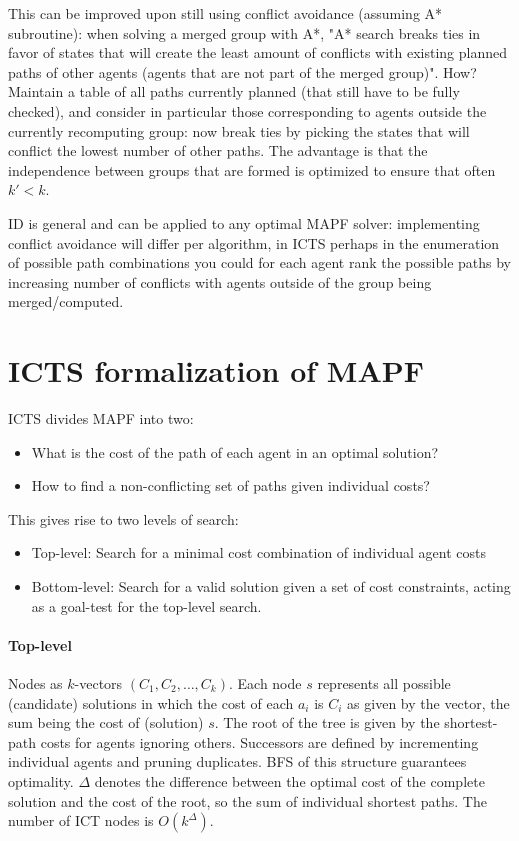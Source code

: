 \documentclass[a4paper,10pt,english]{article}
\begin{document}
	This can be improved upon still using conflict avoidance (assuming A* subroutine): when solving a merged group with A*, "A* search breaks ties in favor of states that will create the least amount of conflicts with existing planned paths of other agents (agents that are not part of the merged group)". How? Maintain a table of all paths currently planned (that still have to be fully checked), and consider in particular those corresponding to agents outside the currently recomputing group: now break ties by picking the states that will conflict the lowest number of other paths. The advantage is that the independence between groups that are formed is optimized to ensure that often $k'<k$.
	
	ID is general and can be applied to any optimal MAPF solver: implementing conflict avoidance will differ per algorithm, in ICTS perhaps in the enumeration of possible path combinations you could for each agent rank the possible paths by increasing number of conflicts with agents outside of the group being merged/computed.
	\section{ICTS formalization of MAPF}
	ICTS divides MAPF into two:
	\begin{itemize}
		\item What is the cost of the path of each agent in an optimal solution?
		\item How to find a non-conflicting set of paths given individual costs?
	\end{itemize}
	This gives rise to two levels of search:
	\begin{itemize}
		\item Top-level: Search for a minimal cost combination of individual agent costs
		\item Bottom-level: Search for a valid solution given a set of cost constraints, acting as a goal-test for the top-level search.
	\end{itemize}
	\paragraph{Top-level}
	Nodes as $k$-vectors $(C_1,C_2,\ldots,C_k)$. Each node $s$ represents all possible (candidate) solutions in which the cost of each $a_i$ is $C_i$ as given by the vector, the sum being the cost of (solution) $s$. The root of the tree is given by the shortest-path costs for agents ignoring others. Successors are defined by incrementing individual agents and pruning duplicates. BFS of this structure guarantees optimality. $\Delta$ denotes the difference between the optimal cost of the complete solution and the cost of the root, so the sum of individual shortest paths. The number of ICT nodes is $O(k^\Delta)$.
	
\end{document}
